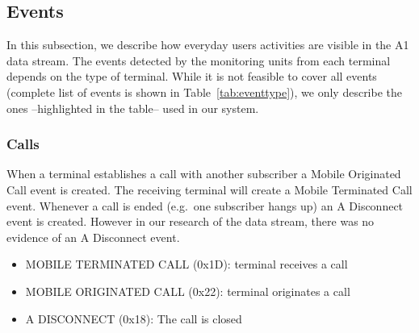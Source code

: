 \documentclass[master,english]{hgbthesis}
\begin{document}
\subsection{Events}
\label{subsec:events}
In this subsection, we describe how everyday users activities are visible in the A1 data stream. The events detected by the monitoring units from each terminal depends on the type of terminal. While it is not feasible to cover all events (complete list of events is shown in Table~\ref{tab:eventtype}), we only describe the ones --highlighted in the table-- used in our system.
\subsubsection{Calls}
When a terminal establishes a call with another subscriber a Mobile Originated Call event is created. The receiving terminal will create a Mobile Terminated Call event. Whenever a call is ended (e.g.\ one subscriber hangs up) an A Disconnect event is created. However in our research of the data stream, there was no evidence of an A Disconnect event.
\begin{itemize}
	\item MOBILE TERMINATED CALL (0x1D): terminal receives a call
	\item MOBILE ORIGINATED CALL (0x22): terminal originates a call
	\item A DISCONNECT (0x18): The call is closed
\end{itemize}
\end{document}
